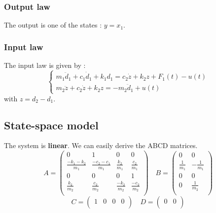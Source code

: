 \subsubsection{Output law}
The output is one of the states : $y = x_1$.

\subsubsection{Input law}
The input law is given by \cite{sciencedirect_amd} :
$$
\begin{cases}
    m_{1}\ddot{d}_{1} + c_{1}\dot{d}_{1} + k_{1}d_{1} = c_{2}\dot{z} + k_{2}z + F_{1}(t) - u(t)\\
    m_{2}\ddot{z} + c_{2}\dot{z} + k_{2}z = -m_{2}\ddot{d}_{1} + u(t)
\end{cases}
$$
with $z = d_2 - d_1$.

\subsection{State-space model}
The system is \textbf{linear}. We can easily derive the ABCD matrices.
$$
A = \begin{pmatrix}
    0 & 1 & 0 & 0 \\
    \frac{-k_1-k_2}{m_1} & \frac{-c_2-c_1}{m_1} & \frac{k_2}{m_1} & \frac{c_2}{m_1} \\
    0 & 0 & 0 & 1 \\ 
    \frac{k_2}{m_2} & \frac{c_2}{m_2} & \frac{-k_2}{m_2} & \frac{-c_2}{m_2}\\
\end{pmatrix}
\quad
B = \begin{pmatrix}
    0 & 0\\
    \frac{1}{m_1} & -\frac{1}{m_1}\\
    0 & 0\\
    0 & \frac{1}{m_2}\\
\end{pmatrix}
$$
$$
C = \begin{pmatrix}
    1 & 0 & 0 & 0\\
\end{pmatrix}
\quad
D = \begin{pmatrix}
    0 & 0\\
\end{pmatrix}
$$

